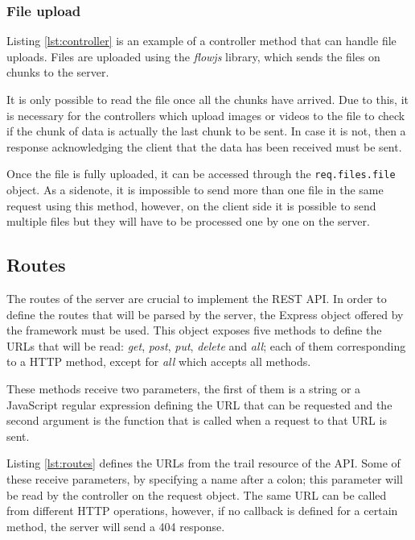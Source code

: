 \subsubsection*{File upload}

Listing \ref{lst:controller} is an example of a controller method that can handle file uploads. Files are uploaded using the \textit{flowjs} \cite{flowjs} library, which sends the files on chunks to the server. 

It is only possible to read the file once all the chunks have arrived. Due to this, it is necessary for the controllers which upload images or videos to the file to check if the chunk of data is actually the last chunk to be sent. In case it is not, then a response acknowledging the client that the data has been received must be sent.

Once the file is fully uploaded, it can be accessed through the \texttt{req.files.file} object. As a sidenote, it is impossible to send more than one file in the same request using this method, however, on the client side it is possible to send multiple files but they will have to be processed one by one on the server.

\subsection{Routes}

The routes of the server are crucial to implement the REST API. In order to define the routes that will be parsed by the server, the Express object offered by the framework must be used. This object exposes five methods to define the URLs that will be read: \textit{get}, \textit{post}, \textit{put}, \textit{delete} and \textit{all}; each of them corresponding to a HTTP method, except for \textit{all} which accepts all methods.

These methods receive two parameters, the first of them is a string or a JavaScript regular expression defining the URL that can be requested and the second argument is the function that is called when a request to that URL is sent.

Listing \ref{lst:routes} defines the URLs from the trail resource of the API. Some of these receive parameters, by specifying a name after a colon; this parameter will be read by the controller on the request object. The same URL can be called from different HTTP operations, however, if no callback is defined for a certain method, the server will send a 404 response.

